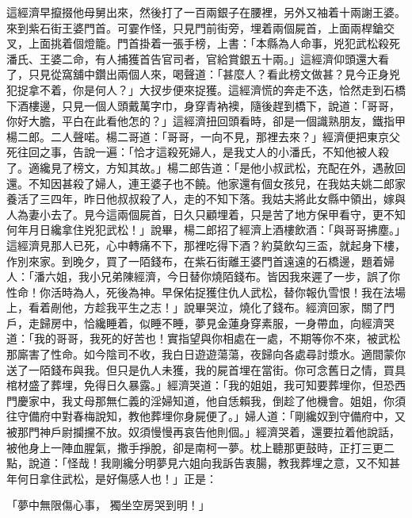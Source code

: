 \begin{showcontents}{}
這經濟早攛掇他母舅出來，然後打了一百兩銀子在腰裡，另外又袖着十兩謝王婆。來到紫石街王婆門首。可霎作怪，只見門前街旁，埋着兩個屍首，上面兩桿鎗交叉，上面挑着個燈籠。門首掛着一張手榜，上書：「本縣為人命事，兇犯武松殺死潘氏、王婆二命，有人捕獲首告官司者，官給賞銀五十兩。」這經濟仰頭還大看了，只見從窩舖中鑽出兩個人來，喝聲道：「甚麼人？看此榜文做甚？見今正身兇犯捉拿不着，你是何人？」大扠步便來捉獲。這經濟慌的奔走不迭，恰然走到石橋下酒樓邊，只見一個人頭戴萬字巾，身穿青衲襖，隨後趕到橋下，說道：「哥哥，你好大膽，平白在此看他怎的？」這經濟扭回頭看時，卻是一個識熟朋友，鐵指甲楊二郎。二人聲喏。楊二哥道：「哥哥，一向不見，那裡去來？」經濟便把東京父死往回之事，告說一遍：「恰才這殺死婦人，是我丈人的小潘氏，不知他被人殺了。適纔見了榜文，方知其故。」楊二郎告道：「是他小叔武松，充配在外，遇赦回還。不知因甚殺了婦人，連王婆子也不饒。他家還有個女孩兒，在我姑夫姚二郎家養活了三四年，昨日他叔叔殺了人，走的不知下落。我姑夫將此女縣中領出，嫁與人為妻小去了。見今這兩個屍首，日久只顧埋着，只是苦了地方保甲看守，更不知何年月日纔拿住兇犯武松！」說畢，楊二郎招了經濟上酒樓飲酒：「與哥哥拂塵。」這經濟見那人已死，心中轉痛不下，那裡吃得下酒？約莫飲勾三盃，就起身下樓，作別來家。到晚夕，買了一陌錢布，在紫石街離王婆門首遠遠的石橋邊，題着婦人：「潘六姐，我小兄弟陳經濟，今日替你燒陌錢布。皆因我來遲了一步，誤了你性命！你活時為人，死後為神。早保佑捉獲住仇人武松，替你報仇雪恨！我在法場上，看着剮他，方趁我平生之志！」說畢哭泣，燒化了錢布。經濟回家，關了門戶，走歸房中，恰纔睡着，似睡不睡，夢見金蓮身穿素服，一身帶血，向經濟哭道：「我的哥哥，我死的好苦也！實指望與你相處在一處，不期等你不來，被武松那廝害了性命。如今陰司不收，我白日遊遊蕩蕩，夜歸向各處尋討漿水。適間蒙你送了一陌錢布與我。但只是仇人未獲，我的屍首埋在當街。你可念舊日之情，買具棺材盛了葬埋，免得日久暴露。」經濟哭道：「我的姐姐，我可知要葬埋你，但恐西門慶家中，我丈母那無仁義的淫婦知道，他自恁賴我，倒趁了他機會。姐姐，你須往守備府中對春梅說知，教他葬埋你身屍便了。」婦人道：「剛纔奴到守備府中，又被那門神戶尉攔攩不放。奴須慢慢再哀告他則個。」經濟哭着，還要拉着他說話，被他身上一陣血腥氣，撒手掙脫，卻是南柯一夢。枕上聽那更鼓時，正打三更二點，說道：「怪哉！我剛纔分明夢見六姐向我訴告衷腸，教我葬埋之意，又不知甚年何日拿住武松，是好傷感人也！」正是：

「夢中無限傷心事，  獨坐空房哭到明！」


\end{showcontents}
